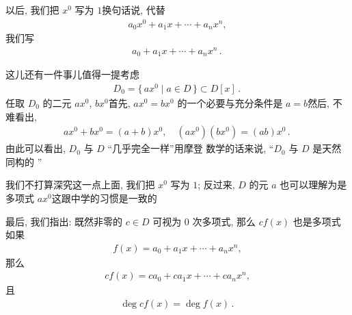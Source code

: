 \begin{remark}
    以后, 我们把 $x^0$ 写为 $1$\period 换句话说, 代替
    \begin{align*}
        a_0 x^0 + a_1 x + \cdots + a_n x^n,
    \end{align*}
    我们写
    \begin{align*}
        a_0 + a_1 x + \cdots + a_n x^n \period
    \end{align*}

    这儿还有一件事儿值得一提\period 考虑
    \begin{align*}
        D_0 = \{\, ax^0 \mid a \in D \,\} \subset D[x] \period
    \end{align*}
    任取 $D_0$ 的二元 $ax^0$, $bx^0$\period 首先, $ax^0 = bx^0$ 的一个必要与充分条件是 $a=b$\period 然后, 不难看出,
    \begin{align*}
        ax^0 + bx^0 = (a+b)x^0, \quad (ax^0)(bx^0) = (ab)x^0 \period
    \end{align*}
    由此可以看出, $D_0$ 与 $D$ ``几乎完全一样''\period 用摩登  数学的话来说, ``$D_0$ 与 $D$ 是天然同构的 ''\period

    我们不打算深究这一点\period 上面, 我们把 $x^0$ 写为 $1$; 反过来, $D$ 的元 $a$ 也可以理解为是多项式 $ax^0$\period 这跟中学的习惯是一致的\period

    最后, 我们指出: 既然非零的 $c \in D$ 可视为 $0$ 次多项式, 那么 $cf(x)$ 也是多项式\period 如果
    \begin{align*}
        f(x) = a_0 + a_1 x + \cdots + a_n x^n,
    \end{align*}
    那么
    \begin{align*}
        cf(x) = ca_0 + ca_1 x + \cdots + ca_n x^n,
    \end{align*}
    且
    \begin{align*}
        \deg cf(x) = \deg f(x) \period
    \end{align*}
\end{remark}

